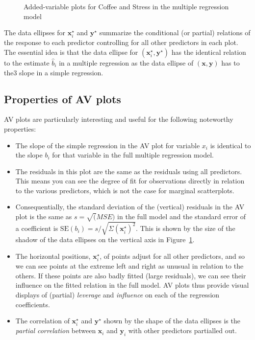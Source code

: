 \documentclass[
  letterpaper,
  10pt,
  krantz2]{krantz}
\begin{document}
{\begin{figure}[H]
{}

\caption{\label{fig-coffee-avPlots}Added-variable plots for Coffee and
Stress in the multiple regression model}

\end{figure}%

The data ellipses for \(\mathbf{x}_i^\star\) and \(\mathbf{y}^\star\)
summarize the conditional (or partial) relations of the response to each
predictor controlling for all other predictors in each plot. The
essential idea is that the data ellipse for
\((\mathbf{x}_i^\star, \mathbf{y}^\star)\) has the identical relation to
the estimate \(\hat{b}_i\) in a multiple regression as the data ellipse
of \((\mathbf{x}, \mathbf{y})\) has to the3 slope in a simple
regression.

\subsection{Properties of AV plots}\label{properties-of-av-plots}

AV plots are particularly interesting and useful for the following
noteworthy properties:

\begin{itemize}
\item
  The slope of the simple regression in the AV plot for variable \(x_i\)
  is identical to the slope \(b_i\) for that variable in the full
  multiple regression model.
\item
  The residuals in this plot are the same as the residuals using all
  predictors. This means you can see the degree of fit for observations
  directly in relation to the various predictors, which is not the case
  for marginal scatterplots.
\item
  Consequentially, the standard deviation of the (vertical) residuals in
  the AV plot is the same as \(s = \sqrt(MSE)\) in the full model and
  the standard error of a coefficient is
  \(\text{SE}(b_i) = s / \sqrt{\Sigma (\mathbf{x}_i^\star)^2}\). This is
  shown by the size of the shadow of the data ellipses on the vertical
  axis in Figure~\ref{fig-coffee-avPlots}.
\item
  The horizontal positions, \(\mathbf{x}_i^\star\), of points adjust for
  all other predictors, and so we can see points at the extreme left and
  right as unusual in relation to the others. If these points are also
  badly fitted (large residuals), we can see their influence on the
  fitted relation in the full model. AV plots thus provide visual
  displays of (partial) \emph{leverage} and \emph{influence} on each of
  the regression coefficients.
\item
  The correlation of \(\mathbf{x}_i^\star\) and \(\mathbf{y}^\star\)
  shown by the shape of the data ellipses is the \emph{partial
  correlation} between \(\mathbf{x}_i\) and \(\mathbf{y}_i\) with other
  predictors partialled out.
\end{itemize}

}
\end{document}
